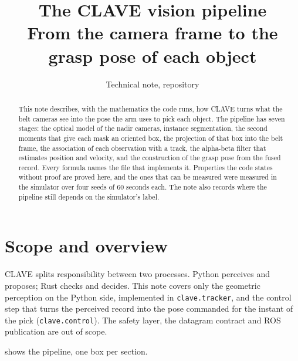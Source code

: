 \documentclass[11pt,a4paper]{article}
\title{The CLAVE vision pipeline\\[0.3em]
\large From the camera frame to the grasp pose of each object}
\author{Technical note, \code{clave} repository}
\date{}
\theoremstyle{definition}
\theoremstyle{remark}
\newcommand{\code}[1]{\texttt{#1}}
\begin{document}
\maketitle

\begin{abstract}
This note describes, with the mathematics the code runs, how CLAVE turns what
the belt cameras see into the pose the arm uses to pick each object. The
pipeline has seven stages: the optical model of the nadir cameras, instance
segmentation, the second moments that give each mask an oriented box, the
projection of that box into the belt frame, the association of each observation
with a track, the alpha-beta filter that estimates position and velocity, and
the construction of the grasp pose from the fused record. Every formula names
the file that implements it. Properties the code states without proof are
proved here, and the ones that can be measured were measured in the simulator
over four seeds of 60 seconds each. The note also records where the pipeline
still depends on the simulator's label.
\end{abstract}

\tableofcontents

\section{Scope and overview}
\label{sec:scope}

CLAVE splits responsibility between two processes. Python perceives and
proposes; Rust checks and decides. This note covers only the geometric
perception on the Python side, implemented in \code{clave.tracker}, and the
control step that turns the perceived record into the pose commanded for the
instant of the pick (\code{clave.control}). The safety layer, the datagram
contract and ROS publication are out of scope.

 shows the pipeline, one box per section.
\end{document}
